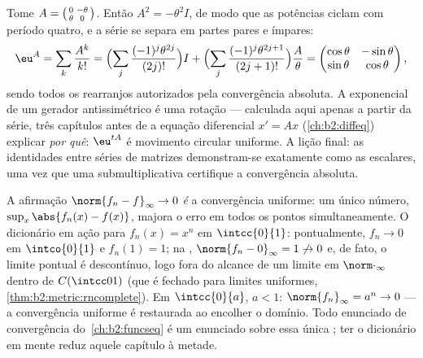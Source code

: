 \begin{example}\label{ex:b2:nvs:rotationexp}
Tome $A = \begin{psmallmatrix}0 & -\theta\\ \theta &
0\end{psmallmatrix}$. Então $A^2 = -\theta^2 I$, de modo que as potências
ciclam com período quatro, e a série se separa em partes
pares e ímpares:
\[
\eu^{A} = \sum_{k}\frac{A^k}{k!}
= \Bigl(\sum_{j}\frac{(-1)^j\theta^{2j}}{(2j)!}\Bigr) I
+ \Bigl(\sum_{j}\frac{(-1)^j\theta^{2j+1}}{(2j+1)!}\Bigr)
\frac{A}{\theta}
= \begin{pmatrix}
\cos\theta & -\sin\theta\\
\sin\theta & \cos\theta
\end{pmatrix},
\]
sendo todos os rearranjos autorizados pela convergência absoluta. A
exponencial de um gerador antissimétrico é uma rotação ---
calculada aqui apenas a partir da série, três capítulos antes de a
equação diferencial $x' = Ax$ (\cref{ch:b2:diffeq}) explicar
\emph{por quê}: $\eu^{tA}$ é movimento circular uniforme. A lição
final: as identidades entre séries de matrizes demonstram-se exatamente como as
escalares, uma vez que uma  submultiplicativa certifique a convergência
absoluta.
\end{example}

\begin{example}\label{ex:b2:nvs:uniformdictionary}
A afirmação $\norm{f_n - f}_\infty \to 0$ \emph{é} a convergência
uniforme: um único número, $\sup_x\abs{f_n(x) - f(x)}$, majora
o erro em todos os pontos simultaneamente. O dicionário em
ação para $f_n(x) = x^n$ em $\intcc{0}{1}$: pontualmente, $f_n
\to 0$ em $\intco{0}{1}$ e $f_n(1) = 1$; na ,
$\norm{f_n - 0}_\infty = 1 \not\to 0$ e, de fato, o limite pontual
é descontínuo, logo fora do alcance de um
limite em $\norm\cdot_\infty$ dentro de $C(\intcc01)$ (que é fechado
para limites uniformes, \cref{thm:b2:metric:rncomplete}). Em
$\intcc{0}{a}$, $a < 1$: $\norm{f_n}_\infty = a^n \to 0$ ---
a convergência uniforme é restaurada ao encolher o domínio. Todo
enunciado de convergência do~\cref{ch:b2:funcseq} é um enunciado
sobre essa única ; ter o dicionário em mente reduz aquele capítulo à
metade.
\end{example}

